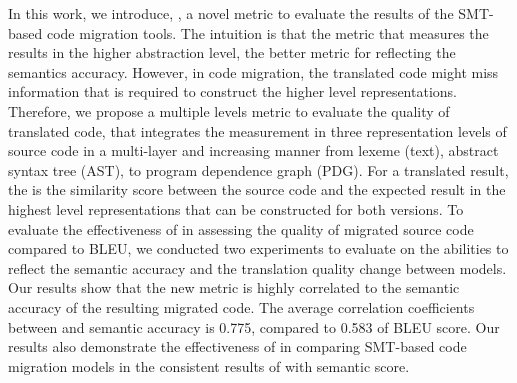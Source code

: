 
In this work, we introduce, {\model}, a novel metric to evaluate the
results of the SMT-based code migration tools. The intuition is that
the metric that measures the results in the higher abstraction level,
the better metric for reflecting the semantics accuracy. However, in
code migration, the translated code might miss information that is
required to construct the higher level representations. Therefore, we
propose a multiple levels metric to evaluate the quality of translated
code, that integrates the measurement in three representation levels
of source code in a multi-layer and increasing manner from lexeme
(text), abstract syntax tree (AST), to program dependence
graph (PDG). For a translated result, the {\model} is the similarity
score between the source code and the expected result in the highest
level representations that can be constructed for both versions. To
evaluate the effectiveness of {\model} in assessing the quality of
migrated source code compared to BLEU, we conducted two experiments to
evaluate {\model} on the abilities to reflect the semantic accuracy
and the translation quality change between models. Our results show that the
new metric {\model} is highly correlated to the semantic accuracy of
the resulting migrated code. The average correlation coefficients between 
{\model} and semantic accuracy is 0.775, compared to 0.583 of BLEU score. 
Our results also demonstrate the effectiveness of {\model} in comparing 
SMT-based code migration models in the consistent results of {\model} 
with semantic score.

